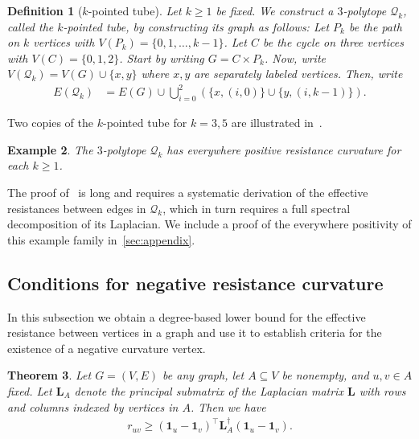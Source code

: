 \documentclass[11pt,a4paper]{amsart}
\newtheorem{theorem}{Theorem}[section]
\newtheorem{definition}[theorem]{Definition}
\newtheorem{example}[theorem]{Example}
\begin{document}
\begin{definition}[$k$-pointed tube]
    Let $k\geq 1$ be fixed. We construct a $3$-polytope $\mathcal{Q}_k$, called the \emph{$k$-pointed tube}, by constructing its graph as follows: Let $P_k$ be the path on $k$ vertices with $V(P_k) = \{0, 1, \dotsc, k-1\}$. Let $C$ be the cycle on three vertices with $V(C) = \{0, 1, 2\}$. Start by writing $G = C\times P_k$. Now, write $V(\mathcal{Q}_k) = V(G) \cup \{x, y\}$ where $x, y$ are separately labeled vertices. Then, write
    \begin{align*}
        E(\mathcal{Q}_k) &= E(G) \cup \bigcup_{i=0}^2 (\{x, (i, 0)\} \cup \{y, (i, k-1)\} ).
    \end{align*}
\end{definition}

Two copies of the $k$-pointed tube for $k=3, 5$ are illustrated in~. 

\begin{example}\label{thm:pencil-positive}
    The $3$-polytope $\mathcal{Q}_k$ has everywhere positive resistance curvature for each $k\geq 1$.
\end{example}

The proof of~ is long and requires a systematic derivation of the effective resistances between edges in $\mathcal{Q}_k$, which in turn requires a full spectral decomposition of its Laplacian. We include a proof of the everywhere positivity of this example family in~\cref{sec:appendix}.

\subsection{Conditions for negative resistance curvature}\label{subsec:resistance-negative}

In this subsection we obtain a degree-based lower bound for the effective resistance between vertices in a graph and use it to establish criteria for the existence of a negative curvature vertex. 

\begin{theorem}\label{thm:resistance-subset-lower-bound}
    Let $G=(V,E)$ be any graph, let $A\subseteq V$ be nonempty, and $u, v\in A$ fixed. Let $\mathbf{L}_A$ denote the principal submatrix of the Laplacian matrix $\mathbf{L}$ with rows and columns indexed by vertices in $A$. Then we have
        \begin{align}\label{eq:resistance-lower-bound}
            r_{uv} \geq (\mathbf{1}_u-\mathbf{1}_v)^\top \mathbf{L}_A^\dagger (\mathbf{1}_u - \mathbf{1}_v).
        \end{align}
\end{theorem}
\end{document}

